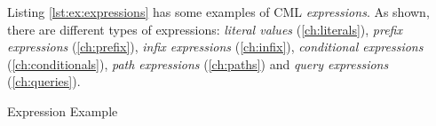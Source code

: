 Listing \ref{lst:ex:expressions} has some examples of CML \emph{expressions}.
As shown, there are different types of expressions:
\emph{literal values} (\ref{ch:literals}),
\emph{prefix expressions} (\ref{ch:prefix}),
\emph{infix expressions} (\ref{ch:infix}),
\emph{conditional expressions} (\ref{ch:conditionals}),
\emph{path expressions} (\ref{ch:paths})
and \emph{query expressions} (\ref{ch:queries}).

\begin{code}
\verbatimfont{\small}

\caption{Expression Example}
\label{lst:ex:expressions}
\end{code}

